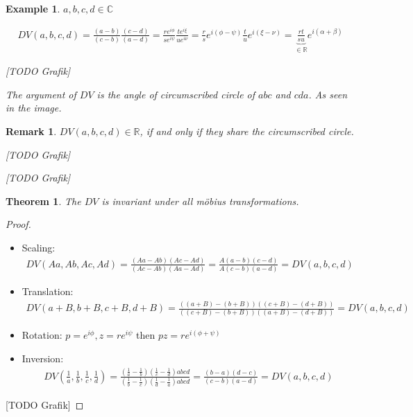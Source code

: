 \documentclass[]{article}
\newtheorem{theorem}{Theorem}
\newtheorem{example}{Example}
\newtheorem{remark}{Remark}
\begin{document}
\begin{example}
	$a,b,c,d \in \mathbb{C}$
	
	\begin{align*}
		DV(a,b,c,d) = \frac{(a-b)}{(c-b)} \frac{(c-d)}{(a-d)} = \frac{r e^{i\phi}}{s e^{i\psi}} \frac{t e^{i\xi}}{u e^{i\nu}} = \frac{r}{s} e^{i(\phi - \psi)} \frac{t}{u} e^{i(\xi - \nu)} = \underbrace{\frac{rt}{su}}_{\in \mathbb{R}} e^{i(\alpha + \beta)}
	\end{align*}
	
	[TODO Grafik]
	
	The argument of $DV$ is the angle of circumscribed circle of $abc$ and $cda$. As seen in the image.
\end{example}

\begin{remark}
	$DV(a,b,c,d) \in \mathbb{R}$, if and only if they share the circumscribed circle.
	
	[TODO Grafik]
	
	[TODO Grafik]
\end{remark}

\begin{theorem}
	The $DV$ is invariant under all möbius transformations.
\end{theorem}

\begin{proof}
	\begin{itemize}
		\item Scaling:
		\begin{align*}
			DV(Aa, Ab, Ac, Ad)= \frac{(Aa - Ab)(Ac - Ad)}{(Ac - Ab)(Aa - Ad)} = \frac{A(a-b)(c-d)}{A(c-b)(a-d)} = DV(a,b,c,d)
		\end{align*}
		\item Translation:
		\begin{align*}
			DV(a+B, b+B, c+B, d+B)= \frac{((a+B) - (b+B))((c+B) - (d+B))}{((c+B) - (b+B))((a+B) - (d+B))} = DV(a,b,c,d)
		\end{align*}
		\item Rotation: $p=e^{i\phi}, z=r e^{i\psi}$ then $pz=r e^{i(\phi+\psi)}$
		\item Inversion:
		\begin{align*}
			DV\left(\frac{1}{a}, \frac{1}{b}, \frac{1}{c}, \frac{1}{d}\right)= \frac{\left(\frac{1}{a} - \frac{1}{b}\right) \left(\frac{1}{c} - \frac{1}{d}\right) abcd}{\left(\frac{1}{b} - \frac{1}{c}\right) \left(\frac{1}{d} - \frac{1}{a}\right) abcd} = \frac{(b-a)(d-c)}{(c-b)(a-d)} = DV(a,b,c,d)
		\end{align*}
	\end{itemize}
	
	[TODO Grafik]
\end{proof}
\end{document}
